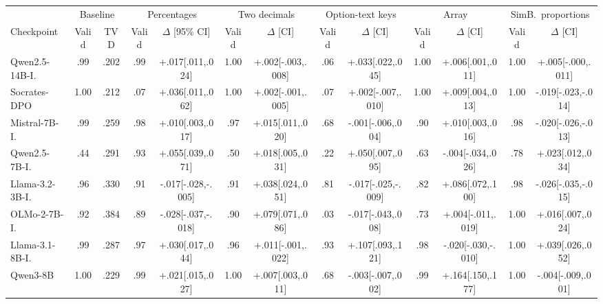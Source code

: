 \begin{table}[t]
\centering\scriptsize
\setlength{\tabcolsep}{1.0pt}
\begin{tabular}{@{}lcc@{\hspace{5pt}}cc@{\hspace{5pt}}cc@{\hspace{5pt}}cc@{\hspace{5pt}}cc@{\hspace{5pt}}cc@{}}
\toprule
& \multicolumn{2}{c}{Baseline} & \multicolumn{2}{c}{Percentages} & \multicolumn{2}{c}{Two decimals} & \multicolumn{2}{c}{Option-text keys} & \multicolumn{2}{c}{Array} & \multicolumn{2}{c}{SimB.\ proportions} \\
\cmidrule(lr){2-3}\cmidrule(lr){4-5}\cmidrule(lr){6-7}\cmidrule(lr){8-9}\cmidrule(lr){10-11}\cmidrule(l){12-13}
Checkpoint & Valid & TVD & Valid & $\Delta$ [95\% CI] & Valid & $\Delta$ [CI] & Valid & $\Delta$ [CI] & Valid & $\Delta$ [CI] & Valid & $\Delta$ [CI] \\
\midrule
Qwen2.5-14B-I. & .99 & .202 & .99 & +.017[.011,.024] & 1.00 & +.002[-.003,.008] & .06 & +.033[.022,.045] & 1.00 & +.006[.001,.011] & 1.00 & +.005[-.000,.011] \\
Socrates-DPO & 1.00 & .212 & .07 & +.036[.011,.062] & 1.00 & +.002[-.001,.005] & .07 & +.002[-.007,.010] & 1.00 & +.009[.004,.013] & 1.00 & -.019[-.023,-.014] \\
Mistral-7B-I. & .99 & .259 & .98 & +.010[.003,.017] & .97 & +.015[.011,.020] & .68 & -.001[-.006,.004] & .90 & +.010[.003,.016] & .98 & -.020[-.026,-.013] \\
Qwen2.5-7B-I. & .44 & .291 & .93 & +.055[.039,.071] & .50 & +.018[.005,.031] & .22 & +.050[.007,.095] & .63 & -.004[-.034,.026] & .78 & +.023[.012,.034] \\
Llama-3.2-3B-I. & .96 & .330 & .91 & -.017[-.028,-.005] & .91 & +.038[.024,.051] & .81 & -.017[-.025,-.009] & .82 & +.086[.072,.100] & .98 & -.026[-.035,-.015] \\
OLMo-2-7B-I. & .92 & .384 & .89 & -.028[-.037,-.018] & .90 & +.079[.071,.086] & .03 & -.017[-.043,.008] & .73 & +.004[-.011,.019] & 1.00 & +.016[.007,.024] \\
Llama-3.1-8B-I. & .99 & .287 & .97 & +.030[.017,.044] & .96 & +.011[-.001,.022] & .93 & +.107[.093,.121] & .98 & -.020[-.030,-.010] & 1.00 & +.039[.026,.052] \\
Qwen3-8B & 1.00 & .229 & .99 & +.021[.015,.027] & 1.00 & +.007[.003,.011] & .68 & -.003[-.007,.002] & .99 & +.164[.150,.177] & 1.00 & -.004[-.009,.001] \\

\end{tabular}
\end{table}
